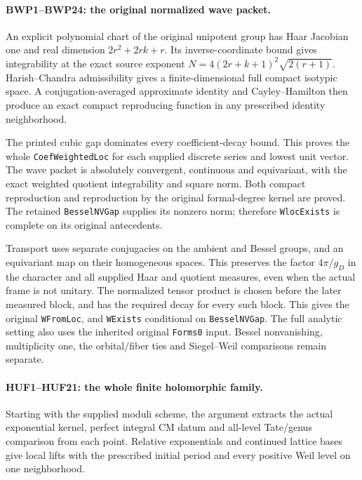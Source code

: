 \documentclass[11pt,a4paper]{article}
\numberwithin{equation}{section}
\theoremstyle{remark}\newtheorem{remark}[theorem]{Remark}
\begin{document}
\paragraph{BWP1--BWP24: the original normalized wave packet.}
An explicit polynomial chart of the original unipotent group has
Haar Jacobian one and real dimension \(2r^2+2rk+r\).
Its inverse-coordinate bound gives integrability at the exact source
exponent \(N=4(2r+k+1)^2\sqrt{2(r+1)}\).
Harish--Chandra admissibility gives a finite-dimensional full compact
isotypic space. A conjugation-averaged approximate identity and
Cayley--Hamilton then produce an exact compact reproducing function
in any prescribed identity neighborhood.

The printed cubic gap dominates every coefficient-decay bound.
This proves the whole \texttt{Coef\allowbreak Weighted\allowbreak Loc} for each supplied
discrete series and lowest unit vector. The wave packet is absolutely
convergent, continuous and equivariant, with the exact weighted
quotient integrability and square norm. Both compact reproduction
and reproduction by the original formal-degree kernel are proved.
The retained \texttt{Bessel\allowbreak NVGap} supplies its nonzero norm;
therefore \texttt{Wloc\allowbreak Exists} is complete on its original antecedents.

Transport uses separate conjugacies on the ambient and Bessel groups,
and an equivariant map on their homogeneous spaces. This preserves
the factor \(4\pi/g_D\) in the character and all supplied Haar
and quotient measures, even when the actual frame is not unitary.
The normalized tensor product is chosen before the later measured
block, and has the required decay for every such block. This gives
the original \texttt{WFrom\allowbreak Loc}, and \texttt{WExists} conditional
on \texttt{Bessel\allowbreak NVGap}. The full analytic setting also uses the
inherited original \texttt{Forms0} input. Bessel nonvanishing,
multiplicity one, the orbital/fiber ties and Siegel--Weil comparisons
remain separate.

\paragraph{HUF1--HUF21: the whole finite holomorphic family.}
Starting with the supplied moduli scheme, the argument extracts the
actual exponential kernel, perfect integral CM datum and all-level
Tate/genus comparison from each point. Relative exponentials and
continued lattice bases give local lifts with the prescribed initial
period and every positive Weil level on one neighborhood.
\end{document}
